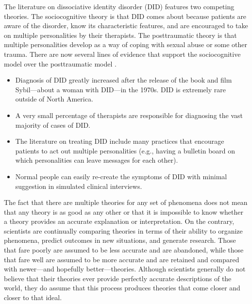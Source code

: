 The literature on dissociative identity disorder (DID) features two competing theories. The sociocognitive theory is that DID comes about because patients are aware of the disorder, know its characteristic features, and are encouraged to take on multiple personalities by their therapists. The posttraumatic theory is that multiple personalities develop as a way of coping with sexual abuse or some other trauma. There are now several lines of evidence that support the sociocognitive model over the posttraumatic model \citep{lilienfeld_50_2011}.

\begin{itemize}
\item Diagnosis of DID greatly increased after the release of the book and film Sybil---about a woman with DID---in the 1970s. DID is extremely rare outside of North America.
\item A very small percentage of therapists are responsible for diagnosing the vast majority of cases of
DID.
\item The literature on treating DID include many practices that encourage patients to act out multiple personalities (e.g., having a bulletin board on which personalities can leave messages for each
other).
\item Normal people can easily re-create the symptoms of DID with minimal suggestion in simulated
clinical interviews.
\end{itemize}


The fact that there are multiple theories for any set of phenomena does not mean that any theory is as good as any other or that it is impossible to know whether a theory provides an accurate explanation or interpretation. On the contrary, scientists are continually comparing theories in terms of their ability to organize phenomena, predict outcomes in new situations, and generate research. Those that fare poorly are assumed to be less accurate and are abandoned, while those that fare well are assumed to be more accurate and are retained and compared with newer---and hopefully better---theories. Although scientists generally do not believe that their theories ever provide perfectly accurate descriptions of the world, they do assume that this process produces theories that come closer and closer to that ideal.

\subsection{}

